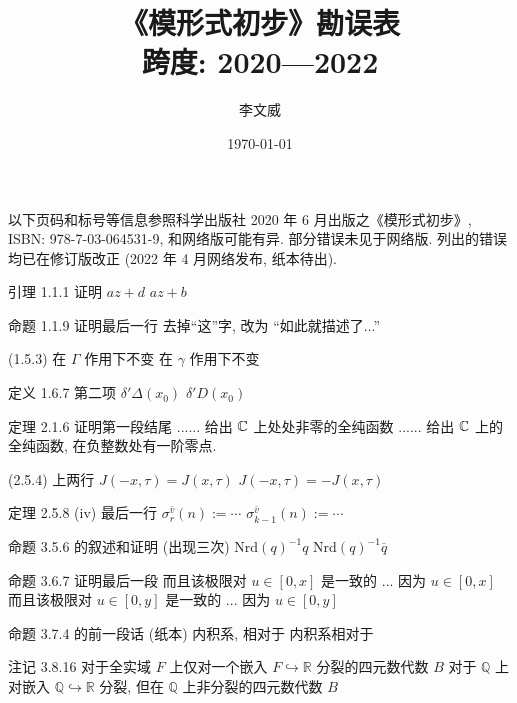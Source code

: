 \documentclass{AJerrata}
\title{\bfseries 《模形式初步》勘误表 \\ 跨度: 2020---2022}
\author{李文威}
\date{\today}
\begin{document}
	\maketitle
	以下页码和标号等信息参照科学出版社 2020 年 6 月出版之《模形式初步》, ISBN: 978-7-03-064531-9, 和网络版可能有异. 部分错误未见于网络版. 列出的错误均已在修订版改正 (2022 年 4 月网络发布, 纸本待出).
	
	\begin{Errata}
		\item[引理 1.1.1 证明]
		\Orig $az + d$
		\Corr $az + b$

		\item[命题 1.1.9 证明最后一行]
		去掉``这''字, 改为 ``如此就描述了...''
		
		\item[(1.5.3)]
		\Orig 在 $\Gamma$ 作用下不变
		\Corr 在 $\gamma$ 作用下不变
		
		\item[定义 1.6.7 第二项]
		\Orig $\delta' \Delta(x_0)$
		\Corr $\delta' D(x_0)$
		
		\item[定理 2.1.6 证明第一段结尾]
		\Orig ...... 给出 $\mathbb{C}$ 上处处非零的全纯函数
		\Corr ...... 给出 $\mathbb{C}$ 上的全纯函数, 在负整数处有一阶零点. 

		\item[(2.5.4) 上两行]
		\Orig $J(-x, \tau) = J(x, \tau)$
		\Corr $J(-x, \tau) = -J(x, \tau)$

        \item[定理 2.5.8 (iv) 最后一行]
        \Orig $\sigma^{\bar{v}}_r(n) := \cdots$
        \Corr $\sigma^{\bar{v}}_{k-1}(n) := \cdots$
		
		\item[命题 3.5.6 的叙述和证明 (出现三次)]
		\Orig $\mathrm{Nrd}(q)^{-1} q$
		\Corr $\mathrm{Nrd}(q)^{-1} \overline{q}$ 
		
		\item[命题 3.6.7 证明最后一段]
		\Orig 而且该极限对 $u \in [0,x]$ 是一致的 ... 因为 $u \in [0,x]$
		\Corr 而且该极限对 $u \in [0,y]$ 是一致的 ... 因为 $u \in [0,y]$
		
		\item[命题 3.7.4 的前一段话 (纸本)]
		\Orig 内积系, 相对于
		\Corr 内积系相对于
		
		\item[注记 3.8.16]
		\Orig 对于全实域 $F$ 上仅对一个嵌入 $F \hookrightarrow \mathbb{R}$ 分裂的四元数代数 $B$
		\Corr 对于 $\mathbb{Q}$ 上对嵌入 $\mathbb{Q} \hookrightarrow \mathbb{R}$ 分裂, 但在 $\mathbb{Q}$ 上非分裂的四元数代数 $B$ 
		

\end{Errata}
\end{document}
